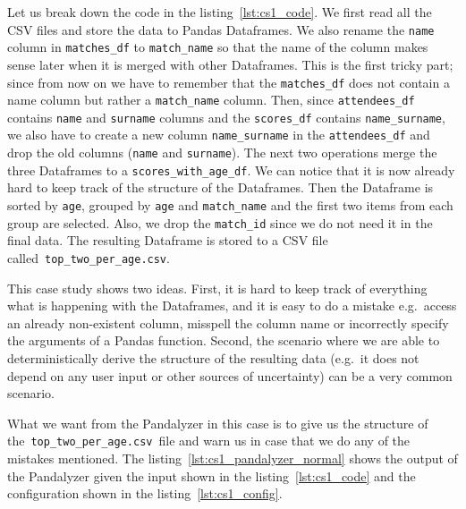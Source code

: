 Let us break down the code in the listing~\ref{lst:cs1_code}.
We first read all the CSV files and store the data to Pandas Dataframes.
We also rename the \verb|name| column in \verb|matches_df| to \verb|match_name| so that the name of the column makes
sense later when it is merged with other Dataframes.
This is the first tricky part; since from now on we have to remember that the \verb|matches_df| does not contain a name
column but rather a \verb|match_name| column.
Then, since \verb|attendees_df| contains \verb|name| and \verb|surname| columns and the \verb|scores_df| contains
\verb|name_surname|, we also have to create a new column \verb|name_surname| in the \verb|attendees_df| and drop the
old columns (\verb|name| and \verb|surname|).
The next two operations merge the three Dataframes to a \verb|scores_with_age_df|.
We can notice that it is now already hard to keep track of the structure of the Dataframes.
Then the Dataframe is sorted by \verb|age|, grouped by \verb|age| and \verb|match_name| and the first two items from each group are selected.
Also, we drop the \verb|match_id| since we do not need it in the final data.
The resulting Dataframe is stored to a CSV file called~\verb|top_two_per_age.csv|.

This case study shows two ideas.
First, it is hard to keep track of everything what is happening with the Dataframes, and it is easy to do a mistake
e.g.~access an already non-existent column, misspell the column name or incorrectly specify the arguments of a Pandas
function.
Second, the scenario where we are able to deterministically derive the structure of the resulting data (e.g.~it does not
depend on any user input or other sources of uncertainty) can be a very common scenario.

What we want from the Pandalyzer in this case is to give us the structure of the~\verb|top_two_per_age.csv|~file
and warn us in case that we do any of the mistakes mentioned.
The listing~\ref{lst:cs1_pandalyzer_normal} shows the output of the Pandalyzer given the input shown in the
listing~\ref{lst:cs1_code} and the configuration shown in the listing~\ref{lst:cs1_config}.

